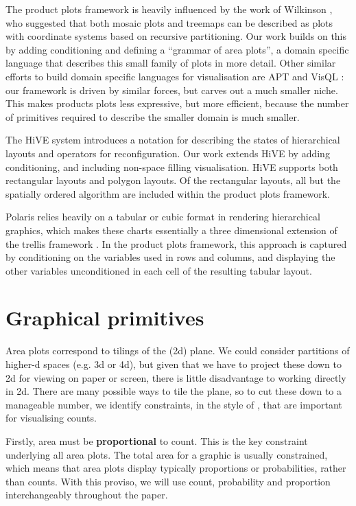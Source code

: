 \documentclass[journal]{vgtc}
\begin{document}
The product plots framework is heavily influenced by the work of Wilkinson \citep{wilkinson:1999, wilkinson:2005}, who suggested that both mosaic plots and treemaps can be described as plots with coordinate systems based on recursive partitioning. Our work builds on this by adding conditioning and defining a ``grammar of area plots'', a domain specific language that describes this small family of plots in more detail. Other similar efforts to build domain specific languages for visualisation are APT \citep{mackinlay:1986} and VisQL \citep{mackinlay:2007}: our framework is driven by similar forces, but carves out a much smaller niche. This makes products plots less expressive, but more efficient, because the number of primitives required to describe the smaller domain is much smaller.

The HiVE system \citep{slingsby:2009} introduces a notation for describing the states of hierarchical layouts and operators for reconfiguration. Our work extends HiVE by adding conditioning, and including non-space filling visualisation. HiVE supports both rectangular layouts and polygon layouts. Of the rectangular layouts, all but the spatially ordered algorithm are included within the product plots framework.

Polaris \cite{stolte:2002} relies heavily on a tabular or cubic format in rendering hierarchical graphics, which makes these charts essentially a three dimensional extension of the trellis framework \citep{cleveland:1994,becker:1996}. In the product plots framework, this approach is captured by conditioning on the variables used in rows and columns, and displaying the other variables unconditioned in each cell of the resulting tabular layout.

\section{Graphical primitives}
\label{sec:primitives}

Area plots correspond to tilings of the (2d) plane. We could consider partitions of higher-d spaces (e.g. 3d or 4d), but given that we have to project these down to 2d for viewing on paper or screen, there is little disadvantage to working directly in 2d. There are many possible ways to tile the plane, so to cut these down to a manageable number, we identify  constraints, in the style of \citep{keim:2002}, that are important for visualising counts.

Firstly, area must be {\bf proportional} to count. This is the key constraint underlying all area plots. The total area for a graphic is usually constrained, which means that area plots display typically proportions or probabilities, rather than counts. With this proviso, we will use count, probability and proportion interchangeably throughout the paper.
\end{document}
